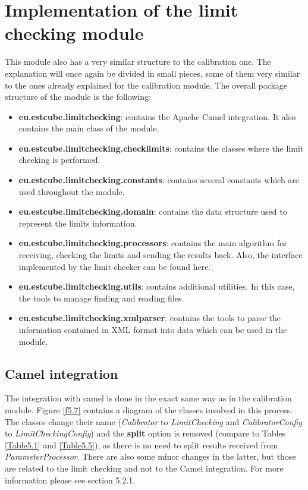 \section{Implementation of the limit checking module}

This module also has a very similar structure to the calibration one. The explanation will once again be divided in small pieces, some of them very similar to the ones already explained for the calibration module. The overall package structure of the module is the following:

\begin{itemize}
\item \textbf{eu.estcube.limitchecking}: contains the Apache Camel integration. It also contains the main class of the module.
\item \textbf{eu.estcube.limitchecking.checklimits}: contains the classes where the limit checking is performed.
\item \textbf{eu.estcube.limitchecking.constants}: contains several constants which are used throughout the module.
\item \textbf{eu.estcube.limitchecking.domain}: contains the data structure used to represent the limits information.
\item \textbf{eu.estcube.limitchecking.processors}: contains the main algorithm for receiving, checking the limits and sending the results back. Also, the interface implemented by the limit checker can be found here.
\item \textbf{eu.estcube.limitchecking.utils}: contains additional utilities. In this case, the tools to manage finding and reading files.
\item \textbf{eu.estcube.limitchecking.xmlparser}: contains the tools to parse the information contained in XML format into data which can be used in the module.
\end{itemize}
\subsection{Camel integration}

The integration with camel is done in the exact same way as in the calibration module. Figure \ref{f5.7} contains a diagram of the classes involved in this process. The classes change their name (\emph{Calibrator} to \emph{LimitChecking} and \emph{CalibratorConfig} to \emph{LimitCheckingConfig}) and the \textbf{split} option is removed (compare to Tables \ref{Table5.1} and \ref{Table5.5}), as there is no need to split results received from \emph{ParameterProcessor}. There are also some minor changes in the latter, but those are related to the limit checking and not to the Camel integration. For more information please see section 5.2.1.

